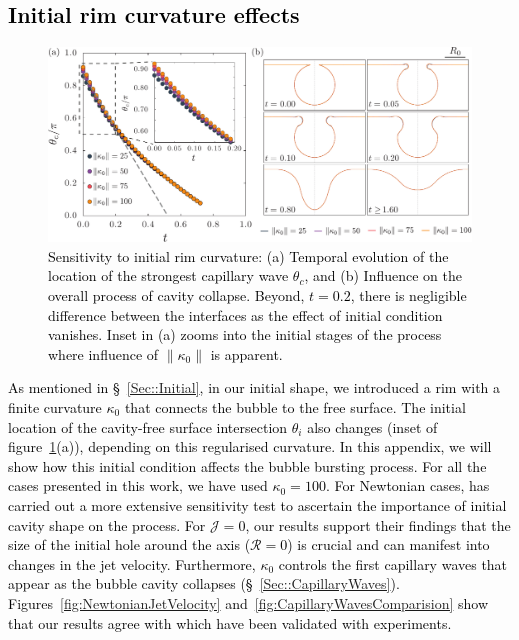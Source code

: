 \documentclass[final]{jfm}
\newcommand*\red{\textcolor{black}}
\begin{document}
\subsection{\red{Initial rim curvature effects}}\label{App::FilletCurvature}
\begin{figure}
	\centerline{\includegraphics[width=\linewidth]{FigureE3_Kappa0-eps-converted-to.pdf}}%
	\caption{\red{Sensitivity to initial rim curvature: (a) Temporal evolution of the location of the strongest capillary wave $\theta_c$, and (b) Influence on the overall process of cavity collapse. Beyond, $t = 0.2$, there is negligible difference between the interfaces as the effect of initial condition vanishes. Inset in (a) zooms into the initial stages of the process where influence of $\|\kappa_0\|$ is apparent.}}
	\label{fig:kappa0}
\end{figure}
\red{As mentioned in \S~\ref{Sec::Initial}, in our initial shape, we introduced a rim with a finite curvature $\kappa_0$ that connects the bubble to the free surface. The initial location of the cavity-free surface intersection $\theta_i$ also changes (inset of figure~\ref{fig:kappa0}(a)), depending on this regularised curvature. In this appendix, we will show how this initial condition affects the bubble bursting process. For all the cases presented in this work, we have used $\kappa_0 = 100$. For Newtonian cases, \citet{deike2018dynamics} has carried out a more extensive sensitivity test to ascertain the importance of initial cavity shape on the process. For $\mathcal{J} = 0$, our results support their findings that the size of the initial hole around the axis ($\mathcal{R} = 0$) is crucial and can manifest into changes in the jet velocity. Furthermore, $\kappa_0$ controls the first capillary waves that appear as the bubble cavity collapses (\S~\ref{Sec::CapillaryWaves}). Figures~\ref{fig:NewtonianJetVelocity} and~\ref{fig:CapillaryWavesComparision} show that our results agree with \cite{deike2018dynamics, gordillo2019capillary} which have been validated with experiments.}
\end{document}
